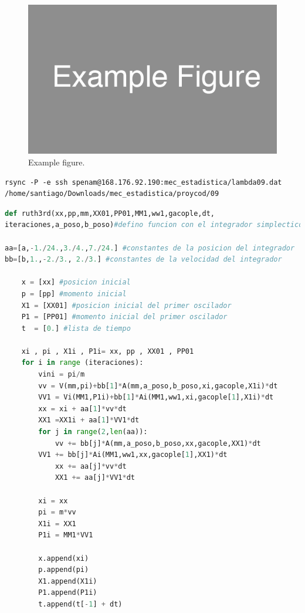 \documentclass[idxtotoc,hyperref,openany]{labbook} %
\begin{document}

\begin{figure}[H] %
\begin{center}
\includegraphics[width=0.5\linewidth]{example_figure}
\end{center}
\caption{Example figure.}
\label{fig:example_figure}
\end{figure}

\begin{lstlisting}
rsync -P -e ssh spenam@168.176.92.190:mec_estadistica/lambda09.dat /home/santiago/Downloads/mec_estadistica/proycod/09
\end{lstlisting}


\begin{lstlisting}[language=Python]
def ruth3rd(xx,pp,mm,XX01,PP01,MM1,ww1,gacople,dt,
iteraciones,a_poso,b_poso)#defino funcion con el integrador simplectico Ruth de 3er orden

aa=[a,-1./24.,3./4.,7./24.] #constantes de la posicion del integrador
bb=[b,1.,-2./3., 2./3.] #constantes de la velocidad del integrador

    x = [xx] #posicion inicial
    p = [pp] #momento inicial
    X1 = [XX01] #posicion inicial del primer oscilador
    P1 = [PP01] #momento inicial del primer oscilador
    t  = [0.] #lista de tiempo
    
    xi , pi , X1i , P1i= xx, pp , XX01 , PP01
    for i in range (iteraciones):
        vini = pi/m
        vv = V(mm,pi)+bb[1]*A(mm,a_poso,b_poso,xi,gacople,X1i)*dt
        VV1 = Vi(MM1,P1i)+bb[1]*Ai(MM1,ww1,xi,gacople[1],X1i)*dt
        xx = xi + aa[1]*vv*dt
        XX1 =XX1i + aa[1]*VV1*dt
        for j in range(2,len(aa)):
            vv += bb[j]*A(mm,a_poso,b_poso,xx,gacople,XX1)*dt
	    VV1 += bb[j]*Ai(MM1,ww1,xx,gacople[1],XX1)*dt
            xx += aa[j]*vv*dt
            XX1 += aa[j]*VV1*dt

        xi = xx
        pi = m*vv
        X1i = XX1
        P1i = MM1*VV1

        x.append(xi)
        p.append(pi) 
        X1.append(X1i)
        P1.append(P1i) 
        t.append(t[-1] + dt)
\end{lstlisting}
\end{document}
